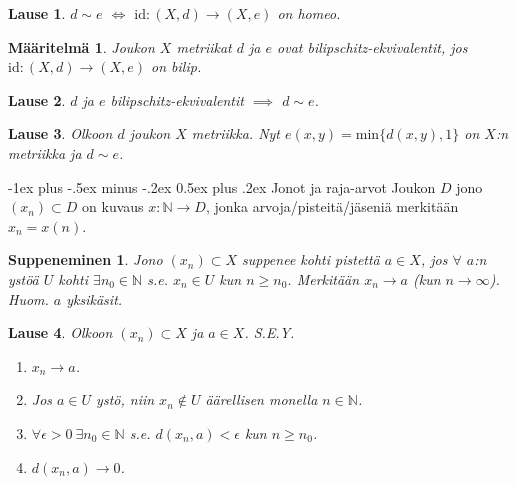 \documentclass[landscape,a4paper,9pt]{extarticle}
\makeatletter
\renewcommand{\section}{\@startsection{section}{1}{0mm}%
                                {-1ex plus -.5ex minus -.2ex}%
                                {0.5ex plus .2ex}%
                                {\color{blue}\normalfont\large\bfseries}}
\theoremstyle{customtheoremstyle}
\newtheorem*{theorem}{Lause}
\newtheorem*{definition}{Määritelmä}
\makeatother
\begin{document}
\begin{multicols*}{3}
\begin{theorem}
  $d \sim e$ $\iff$ $\text{id}: (X,d) \rightarrow (X,e)$ on homeo.
\end{theorem}

\begin{definition}
  Joukon $X$ metriikat $d$ ja $e$ ovat \emph{bilipschitz-ekvivalentit}, jos
  $\text{id}: (X,d) \rightarrow (X,e)$ on bilip.
\end{definition}

\begin{theorem}
  $d$ ja $e$ bilipschitz-ekvivalentit $\implies$ $d \sim e$.
\end{theorem}

\begin{theorem}
  Olkoon $d$ joukon $X$ metriikka. Nyt $e(x,y) = \text{min}\{d(x,y), 1\}$ on
  $X$:n metriikka ja $d \sim e$.
\end{theorem}

\section{Jonot ja raja-arvot}
Joukon $D$ jono $(x_n) \subset D$ on kuvaus $x: \mathbb{N} \rightarrow D$,
jonka arvoja/pisteitä/jäseniä merkitään $x_n = x(n)$.

\newtheorem*{defn:suppeneminen}{Suppeneminen}
\begin{defn:suppeneminen}
  Jono $(x_n) \subset X$ suppenee kohti pistettä $a \in X$, jos $\forall$ $a$:n
  ystöä $U$ kohti $\exists n_0 \in \mathbb{N}$ s.e. $x_n \in U$ kun $n \geq
  n_0$. Merkitään $x_n \rightarrow a$ (kun $n \rightarrow \infty$). Huom. $a$
  yksikäsit.
\end{defn:suppeneminen}

\begin{theorem}
  Olkoon $(x_n) \subset X$ ja $a \in X$. S.E.Y.
  \begin{enumerate}
    \item{$x_n \rightarrow a$.}
    \item{Jos $a \in U$ ystö, niin $x_n \not\in U$ äärellisen monella $n \in
      \mathbb{N}$.}
    \item{$\forall \epsilon > 0 \: \exists n_0 \in \mathbb{N}$ s.e. $d(x_n, a) <
      \epsilon$ kun $n \geq n_0$.}
    \item{$d(x_n, a) \rightarrow 0$.}
  \end{enumerate}
\end{theorem}


\end{multicols*}
\end{document}
